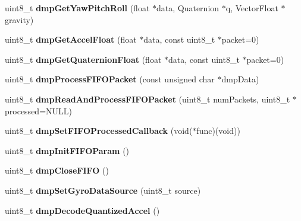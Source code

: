 \begin{DoxyCompactItemize}
\item 
\mbox{\label{classMPU6050_a4e8c0d64e9ad7266b1a7970bb38d6b27}} 
uint8\+\_\+t {\bfseries dmp\+Get\+Yaw\+Pitch\+Roll} (float $\ast$data, Quaternion $\ast$q, Vector\+Float $\ast$gravity)
\item 
\mbox{\label{classMPU6050_a6045ca343e5b35fc454f4793b3f8eaf9}} 
uint8\+\_\+t {\bfseries dmp\+Get\+Accel\+Float} (float $\ast$data, const uint8\+\_\+t $\ast$packet=0)
\item 
\mbox{\label{classMPU6050_ab9021b9acffd400ac6d1b0d78e1a633c}} 
uint8\+\_\+t {\bfseries dmp\+Get\+Quaternion\+Float} (float $\ast$data, const uint8\+\_\+t $\ast$packet=0)
\item 
\mbox{\label{classMPU6050_a6bfac470414ede55359fc5978de72548}} 
uint8\+\_\+t {\bfseries dmp\+Process\+F\+I\+F\+O\+Packet} (const unsigned char $\ast$dmp\+Data)
\item 
\mbox{\label{classMPU6050_acd224b46caa5821bb1815ae0bd7ae326}} 
uint8\+\_\+t {\bfseries dmp\+Read\+And\+Process\+F\+I\+F\+O\+Packet} (uint8\+\_\+t num\+Packets, uint8\+\_\+t $\ast$processed=N\+U\+LL)
\item 
\mbox{\label{classMPU6050_a3dd7662a5e7ef6bfc017c1b6237960f8}} 
uint8\+\_\+t {\bfseries dmp\+Set\+F\+I\+F\+O\+Processed\+Callback} (void($\ast$func)(void))
\item 
\mbox{\label{classMPU6050_ab6b2641479b580a88dbcc36a225a1ff6}} 
uint8\+\_\+t {\bfseries dmp\+Init\+F\+I\+F\+O\+Param} ()
\item 
\mbox{\label{classMPU6050_a9040079b7f934aa2f84f76004aea7e6f}} 
uint8\+\_\+t {\bfseries dmp\+Close\+F\+I\+FO} ()
\item 
\mbox{\label{classMPU6050_a235b9911e8fc8b3674cc9ffcfa03e107}} 
uint8\+\_\+t {\bfseries dmp\+Set\+Gyro\+Data\+Source} (uint8\+\_\+t source)
\item 
\mbox{\label{classMPU6050_a39ed46d7a593d93fbf147318331dd655}} 
uint8\+\_\+t {\bfseries dmp\+Decode\+Quantized\+Accel} ()
\item 

\end{DoxyCompactItemize}

